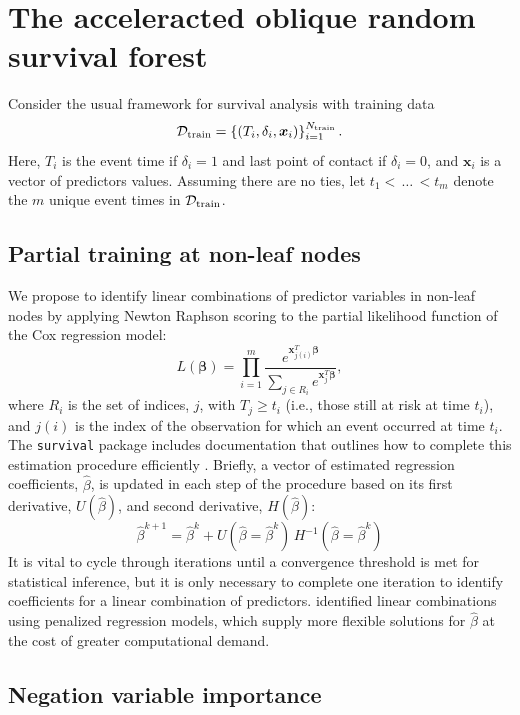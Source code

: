 \documentclass[twoside,11pt]{article}\usepackage[]{graphicx}\usepackage[]{xcolor}
\newcommand{\dataset}{{\cal D}}
\begin{document}
\section{The acceleracted oblique random survival forest}

Consider the usual framework for survival analysis with training data $$\dataset_{\text{train}} = \left\{ (T_i, \delta_i, \bm{x}_{i}) \right\}_{i=1}^{N_{\text{train}}}.$$ Here, $T_i$ is the event time if $\delta_i=1$ and last point of contact if $\delta_i=0$, and $\bm{x}_i$ is a vector of predictors values. Assuming there are no ties, let $t_1 < \, \ldots \, < t_m$ denote the $m$ unique event times in $\dataset_{\text{train}}$.

\subsection{Partial training at non-leaf nodes}

We propose to identify linear combinations of predictor variables in non-leaf nodes by applying Newton Raphson scoring to the partial likelihood function of the Cox regression model:
\begin{equation}\label{eqn:cox-partial-likelihood}
L(\bm\beta) = \prod_{i=1}^m \frac{e^{\bm{x}_{j(i)}^T \bm\beta}}{\sum_{j \in R_i} e^{\bm{x}_j^T \bm\beta}},
\end{equation}
where $R_i$ is the set of indices, $j$, with $T_j \geq t_i$ (i.e., those still at risk at time $t_i$), and $j(i)$ is the index of the observation for which an event occurred at time $t_i$. The \texttt{survival} package includes documentation that outlines how to complete this estimation procedure efficiently \citep[see][exact.nw]{therneau_survival_2022}. Briefly, a vector of estimated regression coefficients, $\hat{\beta}$, is updated in each step of the procedure based on its first derivative, $U(\hat{\beta})$, and second derivative, $H(\hat{\beta})$:
$$ \hat{\beta}^{k+1} =  \hat{\beta}^{k} + U(\hat{\beta} = \hat{\beta}^{k})\, H^{-1}(\hat{\beta} = \hat{\beta}^{k}) $$
It is vital to cycle through iterations until a convergence threshold is met for statistical inference, but it is only necessary to complete one iteration to identify coefficients for a linear combination of predictors. \citet{jaeger2019oblique} identified linear combinations using penalized regression models, which supply more flexible solutions for $\hat{\beta}$ at the cost of greater computational demand.

\subsection{Negation variable importance}
\end{document}
